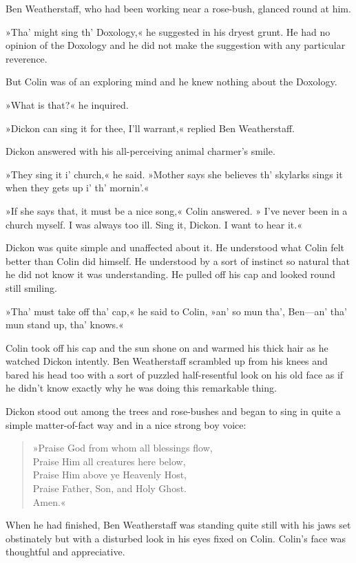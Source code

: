 Ben Weatherstaff, who had been working near a rose-bush, glanced round at him.

»Tha' might sing th' Doxology,« he suggested in his dryest grunt. He had no opinion of the Doxology and he did not make the suggestion with any particular reverence.

But Colin was of an exploring mind and he knew nothing about the Doxology.

»What is that?« he inquired.

»Dickon can sing it for thee, I'll warrant,« replied Ben Weatherstaff.

Dickon answered with his all-perceiving animal charmer's smile.

»They sing it i' church,« he said. »Mother says she believes th' skylarks sings it when they gets up i' th' mornin'.«

»If she says that, it must be a nice song,« Colin answered. » I've never been in a church myself. I was always too ill. Sing it, Dickon. I want to hear it.«

Dickon was quite simple and unaffected about it. He understood what Colin felt better than Colin did himself. He understood by a sort of instinct so natural that he did not know it was understanding. He pulled off his cap and looked round still smiling.

»Tha' must take off tha' cap,« he said to Colin, »an' so mun tha', Ben—an' tha' mun stand up, tha' knows.«

Colin took off his cap and the sun shone on and warmed his thick hair as he watched Dickon intently. Ben Weatherstaff scrambled up from his knees and bared his head too with a sort of puzzled half-resentful look on his old face as if he didn't know exactly why he was doing this remarkable thing.

Dickon stood out among the trees and rose-bushes and began to sing in quite a simple matter-of-fact way and in a nice strong boy voice:

\begin{verse}
»Praise God from whom all blessings flow,\\
Praise Him all creatures here below,\\
Praise Him above ye Heavenly Host,\\
Praise Father, Son, and Holy Ghost.\\
Amen.«
\end{verse}

When he had finished, Ben Weatherstaff was standing quite still with his jaws set obstinately but with a disturbed look in his eyes fixed on Colin. Colin's face was thoughtful and appreciative.

